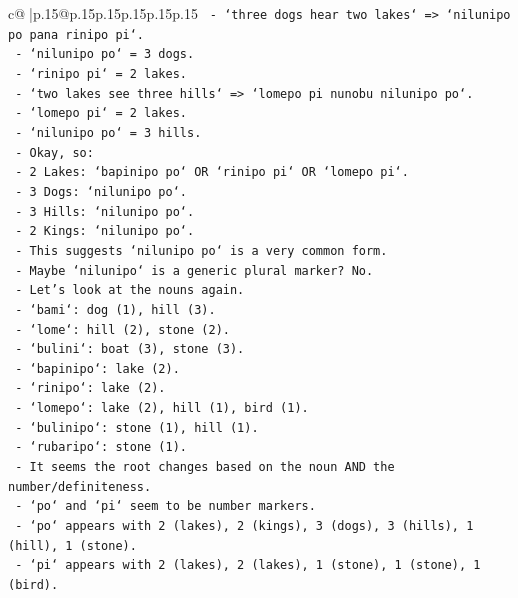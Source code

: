 \documentclass{article}
\begin{document}
{\begin{supertabular}{c@{$\;$}|p{.15\linewidth}@{}p{.15\linewidth}p{.15\linewidth}p{.15\linewidth}p{.15\linewidth}p{.15\linewidth}}
{{{\texttt{     {-} `three dogs hear two lakes` => `nilunipo po pana rinipo pi`.} \\
\texttt{       {-} `nilunipo po` = 3 dogs.} \\
\texttt{       {-} `rinipo pi` = 2 lakes.} \\
\texttt{     {-} `two lakes see three hills` => `lomepo pi nunobu nilunipo po`.} \\
\texttt{       {-} `lomepo pi` = 2 lakes.} \\
\texttt{       {-} `nilunipo po` = 3 hills.} \\
\texttt{     {-} Okay, so:} \\
\texttt{       {-} 2 Lakes: `bapinipo po` OR `rinipo pi` OR `lomepo pi`.} \\
\texttt{       {-} 3 Dogs: `nilunipo po`.} \\
\texttt{       {-} 3 Hills: `nilunipo po`.} \\
\texttt{       {-} 2 Kings: `nilunipo po`.} \\
\texttt{     {-} This suggests `nilunipo po` is a very common form.} \\
\texttt{     {-} Maybe `nilunipo` is a generic plural marker? No.} \\
\texttt{     {-} Let's look at the nouns again.} \\
\texttt{       {-} `bami`: dog (1), hill (3).} \\
\texttt{       {-} `lome`: hill (2), stone (2).} \\
\texttt{       {-} `bulini`: boat (3), stone (3).} \\
\texttt{       {-} `bapinipo`: lake (2).} \\
\texttt{       {-} `rinipo`: lake (2).} \\
\texttt{       {-} `lomepo`: lake (2), hill (1), bird (1).} \\
\texttt{       {-} `bulinipo`: stone (1), hill (1).} \\
\texttt{       {-} `rubaripo`: stone (1).} \\
\texttt{     {-} It seems the root changes based on the noun AND the number/definiteness.} \\
\texttt{     {-} `po` and `pi` seem to be number markers.} \\
\texttt{       {-} `po` appears with 2 (lakes), 2 (kings), 3 (dogs), 3 (hills), 1 (hill), 1 (stone).} \\
\texttt{       {-} `pi` appears with 2 (lakes), 2 (lakes), 1 (stone), 1 (stone), 1 (bird).} \\
}}}
\end{supertabular}}
\end{document}
